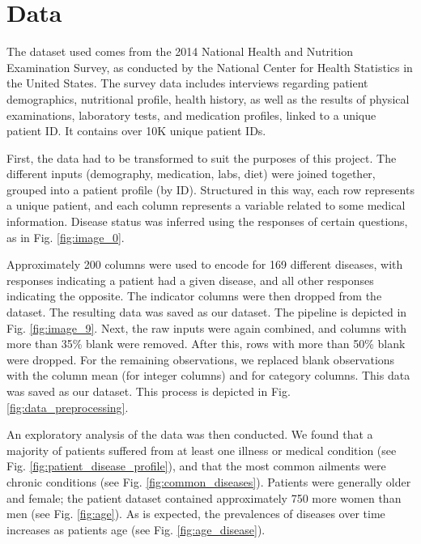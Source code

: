 \documentclass[runningheads]{llncs}
\begin{document}
\section{Data}
The dataset used comes from the 2014 National Health and Nutrition Examination Survey, as conducted by the National Center for Health Statistics in the United States. The survey data includes interviews regarding patient demographics, nutritional profile, health history, as well as the results of physical examinations, laboratory tests, and medication profiles, linked to a unique patient ID. It contains over 10K unique patient IDs.

First, the data had to be transformed to suit the purposes of this project.  The different inputs (demography, medication, labs, diet) were joined together, grouped into a patient profile (by ID). Structured in this way, each row represents a unique patient, and each column represents a variable related to some medical information. Disease status was inferred using the responses of certain questions, as in Fig. \ref{fig:image_0}.

 Approximately 200 columns were used to encode for 169 different diseases, with  responses indicating a patient had a given disease, and all other responses indicating the opposite. The indicator columns were then dropped from the dataset. The resulting data was saved as our  dataset. The pipeline is depicted in Fig. \ref{fig:image_9}. Next, the raw inputs were again combined, and columns with more than 35\% blank were removed. After this, rows with more than 50\% blank were dropped. For the remaining observations, we replaced blank observations with the column mean (for integer columns) and  for category columns. This data was saved as our  dataset. This process is depicted in Fig. \ref{fig:data_preprocessing}.
 
An exploratory analysis of the data was then conducted. We found that a majority of patients suffered from at least one illness or medical condition (see Fig. \ref{fig:patient_disease_profile}), and that the most common ailments were chronic conditions (see Fig. \ref{fig:common_diseases}). Patients were generally older and female; the patient dataset contained approximately 750 more women than men (see Fig. \ref{fig:age}). As is expected, the prevalences of diseases over time increases as patients age (see Fig. \ref{fig:age_disease}).
\end{document}
